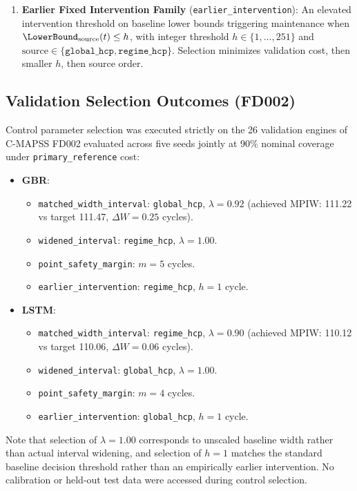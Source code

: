 \begin{enumerate}
    \item \textbf{Earlier Fixed Intervention Family} (\texttt{earlier\_intervention}): An elevated intervention threshold on baseline lower bounds triggering maintenance when $\LowerBound_{\text{source}}(t) \le h$, with integer threshold $h \in \{1, \dots, 251\}$ and $\text{source} \in \{\texttt{global\_hcp}, \texttt{regime\_hcp}\}$. Selection minimizes validation cost, then smaller $h$, then source order.
\end{enumerate}

\subsection*{Validation Selection Outcomes (FD002)}
Control parameter selection was executed strictly on the 26 validation engines of C-MAPSS FD002 evaluated across five seeds jointly at 90\% nominal coverage under \texttt{primary\_reference} cost:
\begin{itemize}
    \item \textbf{GBR}:
    \begin{itemize}
        \item \texttt{matched\_width\_interval}: \texttt{global\_hcp}, $\lambda = 0.92$ (achieved MPIW: 111.22 vs target 111.47, $\Delta W = 0.25$ cycles).
        \item \texttt{widened\_interval}: \texttt{regime\_hcp}, $\lambda = 1.00$.
        \item \texttt{point\_safety\_margin}: $m = 5$ cycles.
        \item \texttt{earlier\_intervention}: \texttt{regime\_hcp}, $h = 1$ cycle.
    \end{itemize}
    \item \textbf{LSTM}:
    \begin{itemize}
        \item \texttt{matched\_width\_interval}: \texttt{regime\_hcp}, $\lambda = 0.90$ (achieved MPIW: 110.12 vs target 110.06, $\Delta W = 0.06$ cycles).
        \item \texttt{widened\_interval}: \texttt{global\_hcp}, $\lambda = 1.00$.
        \item \texttt{point\_safety\_margin}: $m = 4$ cycles.
        \item \texttt{earlier\_intervention}: \texttt{global\_hcp}, $h = 1$ cycle.
    \end{itemize}
\end{itemize}
Note that selection of $\lambda = 1.00$ corresponds to unscaled baseline width rather than actual interval widening, and selection of $h = 1$ matches the standard baseline decision threshold rather than an empirically earlier intervention. No calibration or held-out test data were accessed during control selection.
